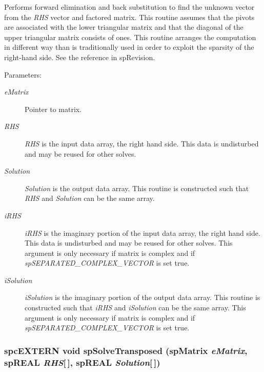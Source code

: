 Performs forward elimination and back substitution to find the unknown vector from the {\em RHS} vector and factored matrix. This routine assumes that the pivots are associated with the lower triangular matrix and that the diagonal of the upper triangular matrix consists of ones. This routine arranges the computation in different way than is traditionally used in order to exploit the sparsity of the right-hand side. See the reference in sp\-Revision.\begin{Desc}
\item[Parameters: ]\par
\begin{description}
\item[{\em 
e\-Matrix}]Pointer to matrix. \item[{\em 
RHS}]{\em RHS} is the input data array, the right hand side. This data is undisturbed and may be reused for other solves. \item[{\em 
Solution}]{\em Solution} is the output data array. This routine is constructed such that {\em RHS} and {\em Solution} can be the same array. \item[{\em 
i\-RHS}]{\em i\-RHS} is the imaginary portion of the input data array, the right hand side. This data is undisturbed and may be reused for other solves. This argument is only necessary if matrix is complex and if {\em sp\-SEPARATED\_\-COMPLEX\_\-VECTOR} is set true. \item[{\em 
i\-Solution}]{\em i\-Solution} is the imaginary portion of the output data array. This routine is constructed such that {\em i\-RHS} and {\em i\-Solution} can be the same array. This argument is only necessary if matrix is complex and if {\em sp\-SEPARATED\_\-COMPLEX\_\-VECTOR} is set true. \end{description}
\end{Desc}
\subsubsection{\setlength{\rightskip}{0pt plus 5cm}spc\-EXTERN void sp\-Solve\-Transposed ({\bf sp\-Matrix} {\em e\-Matrix}, sp\-REAL {\em RHS}[$\,$], sp\-REAL {\em Solution}[$\,$])}\label{spMatrix_8h_a61}


